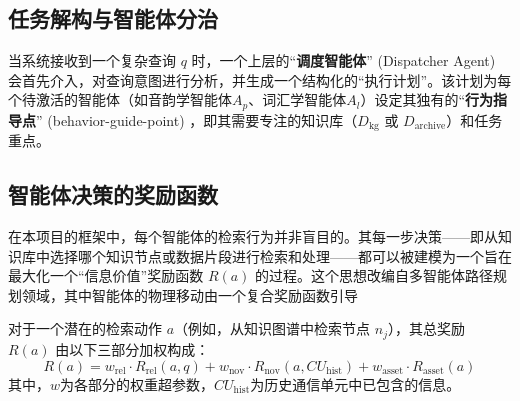 \subsection{任务解构与智能体分治}
当系统接收到一个复杂查询 $q$ 时，一个上层的“\textbf{调度智能体}” (Dispatcher Agent) 会首先介入，对查询意图进行分析，并生成一个结构化的“执行计划”。该计划为每个待激活的智能体（如音韵学智能体$A_p$、词汇学智能体$A_l$）设定其独有的“\textbf{行为指导点}” (behavior-guide-point) \cite{jiao2022multi}，即其需要专注的知识库（$D_{\text{kg}}$ 或 $D_{\text{archive}}$）和任务重点。

\subsection{智能体决策的奖励函数}
在本项目的框架中，每个智能体的检索行为并非盲目的。其每一步决策——即从知识库中选择哪个知识节点或数据片段进行检索和处理——都可以被建模为一个旨在最大化一个“信息价值”奖励函数 $R(a)$ 的过程。这个思想改编自多智能体路径规划领域，其中智能体的物理移动由一个复合奖励函数引导 

对于一个潜在的检索动作 $a$（例如，从知识图谱中检索节点 $n_j$），其总奖励 $R(a)$ 由以下三部分加权构成：
\begin{equation}
R(a) = w_{\text{rel}} \cdot R_{\text{rel}}(a, q) + w_{\text{nov}} \cdot R_{\text{nov}}(a, CU_{\text{hist}}) + w_{\text{asset}} \cdot R_{\text{asset}}(a)
\end{equation}
其中，$w$为各部分的权重超参数，$CU_{\text{hist}}$为历史通信单元中已包含的信息。


